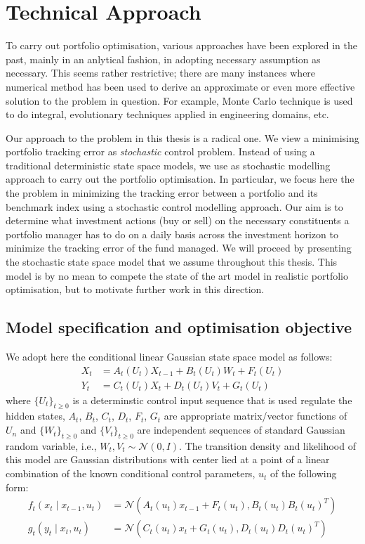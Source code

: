 \section{Technical Approach}
To carry out portfolio optimisation, various approaches have been explored in the past, mainly in an anlytical fashion, in adopting necessary assumption as necessary. This seems rather restrictive; there are many instances where numerical method has been used to derive an approximate or even more effective solution to the problem in question. For example, Monte Carlo technique is used to do integral, evolutionary techniques applied in engineering domains, etc.
 
Our approach to the problem in this thesis is a radical one. We view a minimising portfolio tracking error as \emph{stochastic} control problem. Instead of using a traditional deterministic state space models, we use as stochastic modelling approach to carry out the portfolio optimisation. In particular, we focus here the the problem in minimizing the tracking error between a portfolio and its benchmark index using a stochastic control modelling approach. Our aim is to determine what investment actions (buy or sell) on the necessary constituents a portfolio manager has to do on a daily basis across the investment horizon to minimize the tracking error of the fund managed. We will proceed by presenting the stochastic state space model that we assume throughout this thesis. This model is by no mean to compete the state of the art model in realistic portfolio optimisation, but to motivate further work in this direction.
 
\subsection{Model specification and optimisation objective}
We adopt here the conditional linear Gaussian state space model as follows:
\begin{align*}
  X_t &= A_t(U_t)X_{t-1} + B_t(U_t)W_t + F_t(U_t) \\
  Y_t &= C_t(U_t)X_t + D_t(U_t)V_t + G_t(U_t)
\label{eq:model}
\end{align*}
where $\{U_t\}_{t \geq 0}$ is a determinstic control input sequence that is used regulate the hidden states, $A_t$, $B_t$, $C_t$, $D_t$, $F_t$, $G_t$ are appropriate matrix/vector functions of $U_n$ and  $\{W_t\}_{t \geq 0}$ and  $\{V_t\}_{t \geq 0}$ are independent sequences of standard Gaussian random variable, i.e., $W_t, V_t \sim \mathcal{N}(0,I)$. The transition density and likelihood of this model are Gaussian distributions with center lied at a point of a linear combination of the known conditional control parameters, $u_t$ of the following form:
\begin{align}
  f_t(x_t \mid x_{t-1}, u_t) &= \mathcal{N}(A_t(u_t) x_{t-1} + F_t(u_t), B_t(u_t)B_t(u_t)^T) \nonumber \\
  g_t(y_t \mid x_t, u_t)    &= \mathcal{N}(C_t(u_t) x_t + G_t(u_t), D_t(u_t)D_t(u_t)^T)
\end{align}
 
